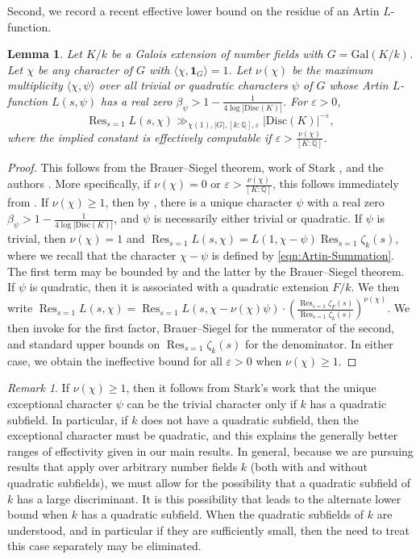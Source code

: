 \documentclass[12pt]{amsart}
\newtheorem{lemma}[theorem]{Lemma}
\theoremstyle{definition} \newtheorem{definition}[theorem]{Definition}
\theoremstyle{example} \newtheorem{example}[theorem]{Example}
\theoremstyle{remark} \newtheorem{remark}{Remark}[theorem]
\numberwithin{equation}{section}
\numberwithin{theorem}{section}
\renewcommand{\epsilon}{\varepsilon}
\renewcommand{\geq}{\geqslant}
\newcommand{\Q}{\mathbb{Q}}
\newcommand{\Res}{\mathop{\mathrm{Res}}}
\begin{document}
Second, we record a recent effective lower bound on the residue of an Artin $L$-function. 
\begin{lemma} \label{lem:ResidueLowerBound}
	Let $K/k$ be a Galois extension of number fields with $G = \mathrm{Gal}(K/k)$. Let $\chi$ be any character of $G$ with $\langle \chi, \mathbf{1}_G \rangle= 1$. Let $\nu(\chi)$ be the maximum multiplicity $\langle \chi, \psi \rangle$ over all trivial or quadratic characters $\psi$ of $G$ whose Artin $L$-function $L(s,\psi)$ has a real zero $\beta_{\psi} > 1 - \frac{1}{4 \log |\mathrm{Disc}(K)|}$.   For $\epsilon > 0$,
	\[
	 \Res_{s=1} L(s,\chi)    \gg_{\chi(1),|G|,[k:\Q],\epsilon} |\mathrm{Disc}(K)|^{-\epsilon },
	\]
 where the implied constant is effectively computable if $\epsilon > \frac{\nu(\chi)}{[K:\Q]}$.
\end{lemma}
\begin{proof}
	This follows from the Brauer--Siegel theorem, work of Stark \cite{Stark-EffectiveBrauerSiegel}, and the authors \cite[Theorem~1.1]{CLOZ}. More specifically, if $\nu(\chi) = 0$ or $\epsilon > \frac{\nu(\chi)}{[K:\Q]}$, this follows immediately from \cite[Theorem~1.1]{CLOZ}.  If $\nu(\chi) \geq 1$, then by \cite{Stark-EffectiveBrauerSiegel}, there is a unique character $\psi$ with a real zero $\beta_{\psi} > 1 - \frac{1}{4 \log |\mathrm{Disc}(K)|}$, and $\psi$ is necessarily either trivial or quadratic.  If $\psi$ is trivial, then $\nu(\chi) = 1$ and $\Res_{s=1} L(s,\chi) = L(1,\chi-\psi) \Res_{s=1} \zeta_k(s)$, where we recall that the character $\chi-\psi$ is defined by \eqref{eqn:Artin-Summation}.  The first term may be bounded by \cite{CLOZ} and the latter by the Brauer--Siegel theorem.  If $\psi$ is quadratic, then it is associated with a quadratic extension $F/k$.  We then write $\Res_{s=1} L(s,\chi) = \Res_{s=1}L(s,\chi-\nu(\chi)\psi) \cdot \left(\frac{\Res_{s=1} \zeta_F(s)}{\Res_{s=1}\zeta_k(s)}\right)^{\nu(\chi)}$.  We then invoke \cite{CLOZ} for the first factor, Brauer--Siegel for the numerator of the second, and standard upper bounds on $\Res_{s=1} \zeta_k(s)$ for the denominator.  In either case, we obtain the ineffective bound for all $\epsilon>0$ when $\nu(\chi) \geq 1$.
\end{proof}
	

\begin{remark}
	If $\nu(\chi) \geq 1$, then it follows from Stark's work that the unique exceptional character $\psi$ can be the trivial character only if $k$ has a quadratic subfield.  In particular, if $k$ does not have a quadratic subfield, then the exceptional character must be quadratic, and this explains the generally better ranges of effectivity given in our main results.  
	In general, because we are pursuing results that apply over arbitrary number fields $k$ (both with and without quadratic subfields), we must allow for the possibility that a quadratic subfield of $k$ has a large discriminant.  It is this possibility that leads to the alternate lower bound when $k$ has a quadratic subfield.  When the quadratic subfields of $k$ are understood, and in particular if they are sufficiently small, then the need to treat this case separately may be eliminated.
\end{remark}
\end{document}
